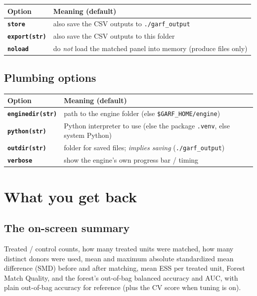 \documentclass[11pt,a4paper]{article}
\newcommand{\opt}[1]{\texttt{\textbf{#1}}}
\newcommand{\code}[1]{\texttt{#1}}
\begin{document}
\begin{tabularx}{\textwidth}{@{}lX@{}}
\toprule
Option & Meaning (default)\\
\midrule
\opt{store}        & also save the CSV outputs to \code{./garf\_output}\\
\opt{export(str)}  & also save the CSV outputs to this folder\\
\opt{noload}       & do \emph{not} load the matched panel into memory (produce files only)\\
\bottomrule
\end{tabularx}

\subsection{Plumbing options}
\begin{tabularx}{\textwidth}{@{}lX@{}}
\toprule
Option & Meaning (default)\\
\midrule
\opt{enginedir(str)} & path to the engine folder (else \code{\$GARF\_HOME/engine})\\
\opt{python(str)}    & Python interpreter to use (else the package \code{.venv}, else system Python)\\
\opt{outdir(str)}    & folder for saved files; \emph{implies saving} (\code{./garf\_output})\\
\opt{verbose}        & show the engine's own progress bar / timing\\
\bottomrule
\end{tabularx}

\section{What you get back}

\subsection{The on-screen summary}
Treated / control counts, how many treated units were matched, how many distinct donors were
used, mean and maximum absolute standardized mean difference (SMD) before and after matching,
mean ESS per treated unit, Forest Match Quality, and the forest's out-of-bag balanced accuracy and
AUC, with plain out-of-bag accuracy for reference (plus the CV score when tuning is on).
\end{document}
